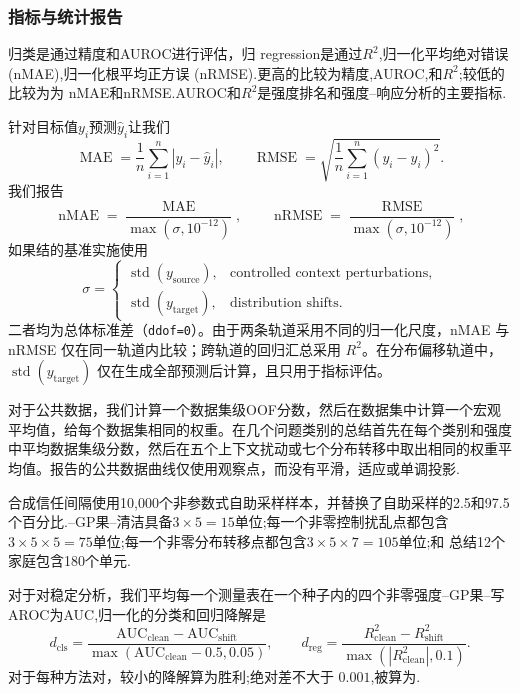 \subsubsection{指标与统计报告}
\label{app:metrics_reporting}

归类是通过精度和AUROC进行评估，归 regression是通过$R^2$,归一化平均绝对错误 (nMAE),归一化根平均正方误 (nRMSE).更高的比较为精度,AUROC,和$R^2$;较低的比较为为 nMAE和nRMSE.AUROC和$R^2$是强度排名和强度--响应分析的主要指标.

针对目标值$y_i$预测$\hat y_i$让我们
\begin{equation}
  \operatorname{MAE}=\frac{1}{n}\sum_{i=1}^{n}|y_i-\hat y_i|,
  \qquad
  \operatorname{RMSE}=\sqrt{\frac{1}{n}\sum_{i=1}^{n}(y_i-\hat y_i)^2}.
\end{equation}
我们报告
\begin{equation}
  \operatorname{nMAE}=\frac{\operatorname{MAE}}{\max(\sigma,10^{-12})},
  \qquad
  \operatorname{nRMSE}=\frac{\operatorname{RMSE}}{\max(\sigma,10^{-12})},
\end{equation}
如果结的基准实施使用
\begin{equation}
  \sigma=
  \begin{cases}
    \operatorname{std}(y_{\mathrm{source}}),
      & \text{controlled context perturbations},\\
    \operatorname{std}(y_{\mathrm{target}}),
      & \text{distribution shifts}.
  \end{cases}
\end{equation}
二者均为总体标准差（\texttt{ddof=0}）。由于两条轨道采用不同的归一化尺度，nMAE 与 nRMSE 仅在同一轨道内比较；跨轨道的回归汇总采用 $R^2$。在分布偏移轨道中，$\operatorname{std}(y_{\mathrm{target}})$ 仅在生成全部预测后计算，且只用于指标评估。

对于公共数据，我们计算一个数据集级OOF分数，然后在数据集中计算一个宏观平均值，给每个数据集相同的权重。在几个问题类别的总结首先在每个类别和强度中平均数据集级分数，然后在五个上下文扰动或七个分布转移中取出相同的权重平均值。报告的公共数据曲线仅使用观察点，而没有平滑，适应或单调投影.

合成信任间隔使用10,000个非参数式自助采样样本，并替换了自助采样的2.5和97.5个百分比.--GP果--清洁具备$3\times5=15$单位;每一个非零控制扰乱点都包含$3\times5\times5=75$单位;每一个非零分布转移点都包含$3\times5\times7=105$单位;和
总结12个家庭包含180个单元.

对于对稳定分析，我们平均每一个测量表在一个种子内的四个非零强度--GP果--写AROC为AUC,归一化的分类和回归降解是
\begin{equation}
  d_{\mathrm{cls}}
  =\frac{\mathrm{AUC}_{\mathrm{clean}}-\mathrm{AUC}_{\mathrm{shift}}}
  {\max(\mathrm{AUC}_{\mathrm{clean}}-0.5,0.05)},
  \qquad
  d_{\mathrm{reg}}
  =\frac{R^2_{\mathrm{clean}}-R^2_{\mathrm{shift}}}
  {\max(|R^2_{\mathrm{clean}}|,0.1)}.
\end{equation}
对于每种方法对，较小的降解算为胜利;绝对差不大于 $0.001$,被算为.

